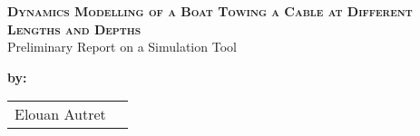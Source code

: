 
\begingroup
\thispagestyle{empty}
\begin{center}
\vspace*{2cm}
{\Huge \textsc{\textbf{Dynamics Modelling of a Boat Towing a Cable at Different Lengths and Depths}}}\\


\vspace*{2cm}
{\huge Preliminary Report on a Simulation Tool}\par %
\end{center}

\vspace*{1.5cm}
\textbf{\large by:} 
\begin{center}
{\large
\begin{tabular}{cc}
Elouan Autret \\
\end{tabular}}
\end{center}


